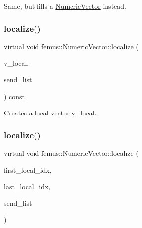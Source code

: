 Same, but fills a {\ttfamily \mbox{\hyperlink{classfemus_1_1_numeric_vector}{Numeric\+Vector}}} instead. 

\mbox{\label{classfemus_1_1_numeric_vector_a8fd7eaef548a167d7a25847545df90d3}} 
\subsubsection{\texorpdfstring{localize()}{localize()}\hspace{0.1cm}{\footnotesize\ttfamily [3/4]}}
{\footnotesize\ttfamily virtual void femus\+::\+Numeric\+Vector\+::localize (\begin{DoxyParamCaption}\item[{\mbox{\hyperlink{classfemus_1_1_numeric_vector}{Numeric\+Vector}} \&}]{v\+\_\+local,  }\item[{const std\+::vector$<$ int $>$ \&}]{send\+\_\+list }\end{DoxyParamCaption}) const\hspace{0.3cm}{\ttfamily [pure virtual]}}



Creates a local vector {\ttfamily v\+\_\+local}. 

\mbox{\label{classfemus_1_1_numeric_vector_aab08801600890c48c64b0ddc08085928}} 
\subsubsection{\texorpdfstring{localize()}{localize()}\hspace{0.1cm}{\footnotesize\ttfamily [4/4]}}
{\footnotesize\ttfamily virtual void femus\+::\+Numeric\+Vector\+::localize (\begin{DoxyParamCaption}\item[{const int}]{first\+\_\+local\+\_\+idx,  }\item[{const int}]{last\+\_\+local\+\_\+idx,  }\item[{const std\+::vector$<$ int $>$ \&}]{send\+\_\+list }\end{DoxyParamCaption})\hspace{0.3cm}{\ttfamily [pure virtual]}}



